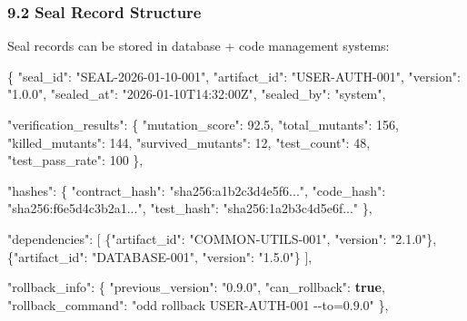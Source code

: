 \documentclass[
]{article}
\newenvironment{Shaded}{}{}
\newcommand{\DataTypeTok}[1]{\textcolor[rgb]{0.56,0.13,0.00}{#1}}
\newcommand{\DecValTok}[1]{\textcolor[rgb]{0.25,0.63,0.44}{#1}}
\newcommand{\FloatTok}[1]{\textcolor[rgb]{0.25,0.63,0.44}{#1}}
\newcommand{\FunctionTok}[1]{\textcolor[rgb]{0.02,0.16,0.49}{#1}}
\newcommand{\KeywordTok}[1]{\textcolor[rgb]{0.00,0.44,0.13}{\textbf{#1}}}
\newcommand{\OtherTok}[1]{\textcolor[rgb]{0.00,0.44,0.13}{#1}}
\newcommand{\StringTok}[1]{\textcolor[rgb]{0.25,0.44,0.63}{#1}}
\begin{document}
\hypertarget{92-seal-record-structure}{%
\subsubsection{9.2 Seal Record
Structure}\label{92-seal-record-structure}}

Seal records can be stored in database + code management systems:

\begin{Shaded}
\begin{Highlighting}[]
\FunctionTok{\{}
  \DataTypeTok{"seal\_id"}\FunctionTok{:} \StringTok{"SEAL{-}2026{-}01{-}10{-}001"}\FunctionTok{,}
  \DataTypeTok{"artifact\_id"}\FunctionTok{:} \StringTok{"USER{-}AUTH{-}001"}\FunctionTok{,}
  \DataTypeTok{"version"}\FunctionTok{:} \StringTok{"1.0.0"}\FunctionTok{,}
  \DataTypeTok{"sealed\_at"}\FunctionTok{:} \StringTok{"2026{-}01{-}10T14:32:00Z"}\FunctionTok{,}
  \DataTypeTok{"sealed\_by"}\FunctionTok{:} \StringTok{"system"}\FunctionTok{,}
  
  \DataTypeTok{"verification\_results"}\FunctionTok{:} \FunctionTok{\{}
    \DataTypeTok{"mutation\_score"}\FunctionTok{:} \FloatTok{92.5}\FunctionTok{,}
    \DataTypeTok{"total\_mutants"}\FunctionTok{:} \DecValTok{156}\FunctionTok{,}
    \DataTypeTok{"killed\_mutants"}\FunctionTok{:} \DecValTok{144}\FunctionTok{,}
    \DataTypeTok{"survived\_mutants"}\FunctionTok{:} \DecValTok{12}\FunctionTok{,}
    \DataTypeTok{"test\_count"}\FunctionTok{:} \DecValTok{48}\FunctionTok{,}
    \DataTypeTok{"test\_pass\_rate"}\FunctionTok{:} \DecValTok{100}
  \FunctionTok{\},}
  
  \DataTypeTok{"hashes"}\FunctionTok{:} \FunctionTok{\{}
    \DataTypeTok{"contract\_hash"}\FunctionTok{:} \StringTok{"sha256:a1b2c3d4e5f6..."}\FunctionTok{,}
    \DataTypeTok{"code\_hash"}\FunctionTok{:} \StringTok{"sha256:f6e5d4c3b2a1..."}\FunctionTok{,}
    \DataTypeTok{"test\_hash"}\FunctionTok{:} \StringTok{"sha256:1a2b3c4d5e6f..."}
  \FunctionTok{\},}
  
  \DataTypeTok{"dependencies"}\FunctionTok{:} \OtherTok{[}
    \FunctionTok{\{}\DataTypeTok{"artifact\_id"}\FunctionTok{:} \StringTok{"COMMON{-}UTILS{-}001"}\FunctionTok{,} \DataTypeTok{"version"}\FunctionTok{:} \StringTok{"2.1.0"}\FunctionTok{\}}\OtherTok{,}
    \FunctionTok{\{}\DataTypeTok{"artifact\_id"}\FunctionTok{:} \StringTok{"DATABASE{-}001"}\FunctionTok{,} \DataTypeTok{"version"}\FunctionTok{:} \StringTok{"1.5.0"}\FunctionTok{\}}
  \OtherTok{]}\FunctionTok{,}
  
  \DataTypeTok{"rollback\_info"}\FunctionTok{:} \FunctionTok{\{}
    \DataTypeTok{"previous\_version"}\FunctionTok{:} \StringTok{"0.9.0"}\FunctionTok{,}
    \DataTypeTok{"can\_rollback"}\FunctionTok{:} \KeywordTok{true}\FunctionTok{,}
    \DataTypeTok{"rollback\_command"}\FunctionTok{:} \StringTok{"odd rollback USER{-}AUTH{-}001 {-}{-}to=0.9.0"}
  \FunctionTok{\},}
  

\end{Highlighting}
\end{Shaded}
\end{document}
